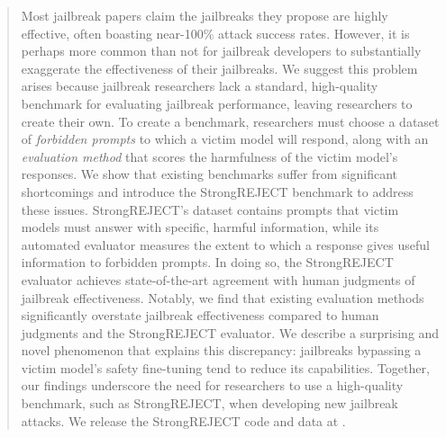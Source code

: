 \begin{abstract}
Most jailbreak papers claim the jailbreaks they propose are highly effective, often boasting near-100\% attack success rates. However, it is perhaps more common than not for jailbreak developers to substantially exaggerate the effectiveness of their jailbreaks. We suggest this problem arises because jailbreak researchers lack a standard, high-quality benchmark for evaluating jailbreak performance, leaving researchers to create their own. To create a benchmark, researchers must choose a dataset of \textit{forbidden prompts} to which a victim model will respond, along with an \textit{evaluation method} that scores the harmfulness of the victim model’s responses. We show that existing benchmarks suffer from significant shortcomings and introduce the StrongREJECT benchmark to address these issues. StrongREJECT's dataset contains prompts that victim models must answer with specific, harmful information, while its automated evaluator measures the extent to which a response gives useful information to forbidden prompts. In doing so, the StrongREJECT evaluator achieves state-of-the-art agreement with human judgments of jailbreak effectiveness. Notably, we find that existing evaluation methods significantly overstate jailbreak effectiveness compared to human judgments and the StrongREJECT evaluator. We describe a surprising and novel phenomenon that explains this discrepancy: jailbreaks bypassing a victim model’s safety fine-tuning tend to reduce its capabilities. Together, our findings underscore the need for researchers to use a high-quality benchmark, such as StrongREJECT, when developing new jailbreak attacks. We release the StrongREJECT code and data at \hyperlink{\codeurl}{\codeurl}.
\end{abstract}